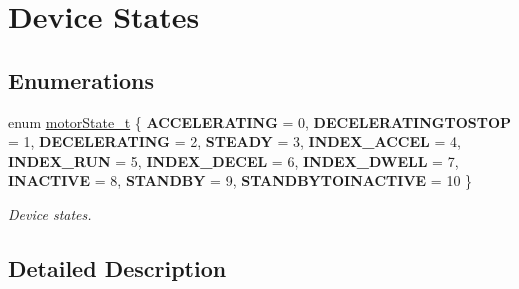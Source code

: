 \hypertarget{group___device___states}{}\section{Device States}
\label{group___device___states}
\subsection*{Enumerations}
\begin{DoxyCompactItemize}
\item 
\mbox{\label{group___device___states_ga9ba865be7705688e94f95a410e917a07}} 
enum \mbox{\hyperlink{group___device___states_ga9ba865be7705688e94f95a410e917a07}{motor\+State\+\_\+t}} \{ \newline
{\bfseries A\+C\+C\+E\+L\+E\+R\+A\+T\+I\+NG} = 0, 
{\bfseries D\+E\+C\+E\+L\+E\+R\+A\+T\+I\+N\+G\+T\+O\+S\+T\+OP} = 1, 
{\bfseries D\+E\+C\+E\+L\+E\+R\+A\+T\+I\+NG} = 2, 
{\bfseries S\+T\+E\+A\+DY} = 3, 
\newline
{\bfseries I\+N\+D\+E\+X\+\_\+\+A\+C\+C\+EL} = 4, 
{\bfseries I\+N\+D\+E\+X\+\_\+\+R\+UN} = 5, 
{\bfseries I\+N\+D\+E\+X\+\_\+\+D\+E\+C\+EL} = 6, 
{\bfseries I\+N\+D\+E\+X\+\_\+\+D\+W\+E\+LL} = 7, 
\newline
{\bfseries I\+N\+A\+C\+T\+I\+VE} = 8, 
{\bfseries S\+T\+A\+N\+D\+BY} = 9, 
{\bfseries S\+T\+A\+N\+D\+B\+Y\+T\+O\+I\+N\+A\+C\+T\+I\+VE} = 10
 \}
\begin{DoxyCompactList}\small\item\em Device states. \end{DoxyCompactList}\end{DoxyCompactItemize}


\subsection{Detailed Description}
